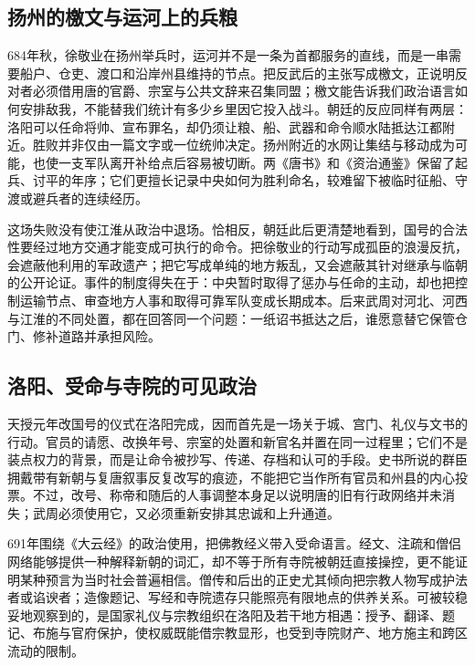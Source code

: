 \subsection{扬州的檄文与运河上的兵粮}
684年秋，徐敬业在扬州举兵时，运河并不是一条为首都服务的直线，而是一串需要船户、仓吏、渡口和沿岸州县维持的节点。把反武后的主张写成檄文，正说明反对者必须借用唐的官爵、宗室与公共文辞来召集同盟；檄文能告诉我们政治语言如何安排敌我，不能替我们统计有多少乡里因它投入战斗。朝廷的反应同样有两层：洛阳可以任命将帅、宣布罪名，却仍须让粮、船、武器和命令顺水陆抵达江都附近。胜败并非仅由一篇文字或一位统帅决定。扬州附近的水网让集结与移动成为可能，也使一支军队离开补给点后容易被切断。两《唐书》和《资治通鉴》保留了起兵、讨平的年序；它们更擅长记录中央如何为胜利命名，较难留下被临时征船、守渡或避兵者的连续经历。

这场失败没有使江淮从政治中退场。恰相反，朝廷此后更清楚地看到，国号的合法性要经过地方交通才能变成可执行的命令。把徐敬业的行动写成孤臣的浪漫反抗，会遮蔽他利用的军政遗产；把它写成单纯的地方叛乱，又会遮蔽其针对继承与临朝的公开论证。事件的制度得失在于：中央暂时取得了惩办与任命的主动，却也把控制运输节点、审查地方人事和取得可靠军队变成长期成本。后来武周对河北、河西与江淮的不同处置，都在回答同一个问题：一纸诏书抵达之后，谁愿意替它保管仓门、修补道路并承担风险。

\subsection{洛阳、受命与寺院的可见政治}
天授元年改国号的仪式在洛阳完成，因而首先是一场关于城、宫门、礼仪与文书的行动。官员的请愿、改换年号、宗室的处置和新官名并置在同一过程里；它们不是装点权力的背景，而是让命令被抄写、传递、存档和认可的手段。史书所说的群臣拥戴带有新朝与复唐叙事反复改写的痕迹，不能把它当作所有官员和州县的内心投票。不过，改号、称帝和随后的人事调整本身足以说明唐的旧有行政网络并未消失；武周必须使用它，又必须重新安排其忠诚和上升通道。

691年围绕《大云经》的政治使用，把佛教经义带入受命语言。经文、注疏和僧侣网络能够提供一种解释新朝的词汇，却不等于所有寺院被朝廷直接操控，更不能证明某种预言为当时社会普遍相信。僧传和后出的正史尤其倾向把宗教人物写成护法者或谄谀者；造像题记、写经和寺院遗存只能照亮有限地点的供养关系。可被较稳妥地观察到的，是国家礼仪与宗教组织在洛阳及若干地方相遇：授予、翻译、题记、布施与官府保护，使权威既能借宗教显形，也受到寺院财产、地方施主和跨区流动的限制。

